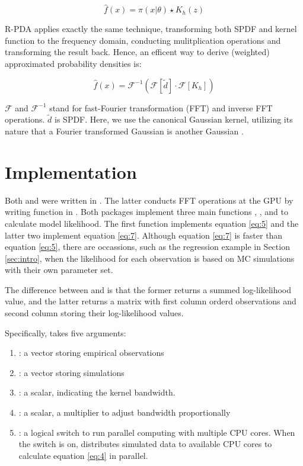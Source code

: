\documentclass[shortnames,nojss,article]{jss}
\begin{document}
\begin{equation} \label{eq:6}
\hat{f}(x) = \pi(x|\theta) \star K_h(z)
\end{equation}

R-PDA applies exactly the same technique, transforming both SPDF and
kernel function to the frequency domain, conducting mulitplication operations
and transforming the result back. Hence, an efficent way to derive (weighted)
approximated probability densities is:

\begin{equation} \label{eq:7}
\hat{f}(x) = \mathcal{F}^{-1}(\mathcal{F}[\tilde{d}] \cdot  \mathcal{F}[K_h])
\end{equation}

$\mathcal{F}$ and $\mathcal{F}^{-1}$ stand for fast-Fourier transformation
(FFT) and inverse FFT operations. $\tilde{d}$ is SPDF.  Here, we use the 
canonical Gaussian kernel, utilizing its nature that a Fourier transformed 
Gaussian is another Gaussian \citep{holmes_practical_2015}.

\section{Implementation}

Both  and  were written in .  The latter 
conducts FFT operations at the GPU by writing  
function in . Both packages implement three main functions 
, , and  to calculate 
model likelihood. The first function implements equation \ref{eq:5} and the 
latter two implement equation \ref{eq:7}.  Although equation \ref{eq:7} is 
faster than equation \ref{eq:5}, there are occassions, such as the regression 
example in Section \ref{sec:intro}, when the likelihood for each observation is 
based on MC simulations with their own parameter set.  

The difference between  and  is
that the former returns a summed log-likelihood value, and the latter returns 
a matrix with first column orderd observations and second column storing their
log-likelihood values. 

Specifically,  takes five arguments:

\begin{enumerate}
\item {}: a vector storing empirical observations 
\item {}: a vector storing simulations
\item {}: a scalar, indicating the kernel bandwidth. 
\item {}: a scalar, a multiplier to adjust bandwidth proportionally 
\item {}: a logical switch to run parallel computing with multiple 
CPU cores. When the switch is on,  distributes simulated 
data to available CPU cores to calculate equation \ref{eq:4} in parallel. 
\end{enumerate}
\end{document}
